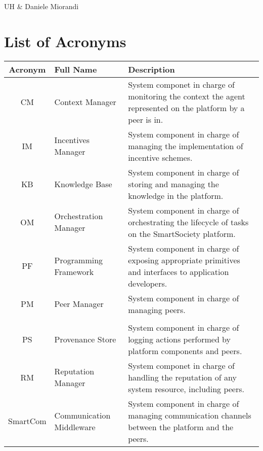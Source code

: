 \documentclass{SmartReport}
\begin{document}
 
  
\deldate{\today}
\qualityassessor{\ldots}
\maketitle

\begin{smartcontributors}
UH & Daniele Miorandi \\
\end{smartcontributors}

\begin{smartabstract}

\end{smartabstract}


\section*{List of Acronyms}
\begin{tabular}{|c|p{3cm}|p{10cm}|}
\hline 
\textbf{Acronym} & \textbf{Full Name} & \textbf{Description} \\
\hline 
\hline 
CM & Context Manager & System componet in charge of monitoring the
context the agent represented on the platform by a peer is in.\\
\hline
IM & Incentives Manager & System component in charge of managing the implementation of incentive schemes.\\  
\hline 
KB & Knowledge Base &  System component in charge of storing and managing the knowledge in the platform.\\
\hline
OM & Orchestration Manager &  System component in charge of
orchestrating the lifecycle of tasks on the SmartSociety platform. \\
\hline 
PF & Programming Framework &  System component in charge of exposing
appropriate primitives and interfaces to application developers.\\
\hline 
PM & Peer Manager &  System component in charge of managing peers.\\
\hline \\
PS & Provenance Store & System component in charge of logging actions performed by platform components and peers.\\
\hline
RM & Reputation Manager & System componet in charge of handling the reputation of any system resource, including peers. \\
\hline
SmartCom & Communication Middleware & System component in charge of managing
communication channels between the platform and the peers. \\
\hline
\end{tabular}
\end{document}
